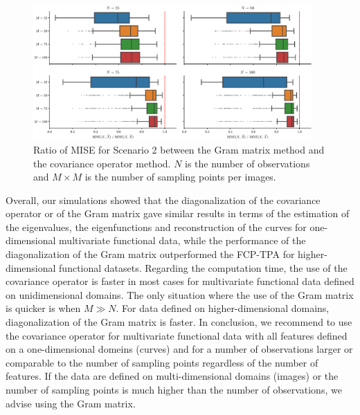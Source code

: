 \begin{results}
\begin{figure}
     \centering
     \includegraphics[width=0.95\textwidth]{figures/scenario_2/mise.eps}
    \caption{Ratio of MISE for Scenario 2 between the Gram matrix method and the covariance operator method. $N$ is the number of observations and $M \times M$ is the number of sampling points per images.}
    \label{fig:mise_mfd_2d}
\end{figure}
\end{results}

Overall, our simulations showed that the diagonalization of the covariance operator or of the Gram matrix gave similar results in terms of the estimation of the eigenvalues, the eigenfunctions and reconstruction of the curves for one-dimensional multivariate functional data, while the performance of the diagonalization of the Gram matrix outperformed the FCP-TPA for higher-dimensional functional datasets. Regarding the computation time, the use of the covariance operator is faster in most cases for multivariate functional data defined on unidimensional domains. The only situation where the use of the Gram matrix is quicker is when $M \gg N$. For data defined on higher-dimensional domains, diagonalization of the Gram matrix is faster.
In conclusion, we recommend to use the covariance operator for multivariate functional data with all features defined on a one-dimensional domeins (curves) and for a number of observations larger or comparable to the number of sampling points regardless of the number of features. If the data are defined on multi-dimensional domains (images) or the number of sampling points is much higher than the number of observations, we advise using the Gram matrix.



